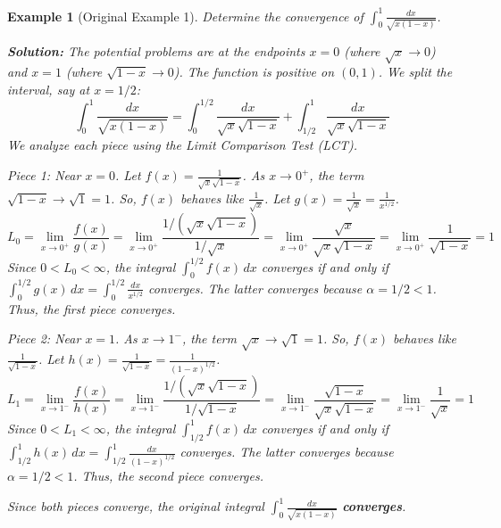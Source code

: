 \documentclass[11pt]{article}
\theoremstyle{mytheoremstyle}
\theoremstyle{mydefinitionstyle}
\newtheorem{example}[theorem]{Example}
\begin{document}
\begin{example}[Original Example 1]
Determine the convergence of $\int_0^1 \frac{dx}{\sqrt{x(1-x)}}$.

\textbf{Solution:}
The potential problems are at the endpoints $x=0$ (where $\sqrt{x} \to 0$) and $x=1$ (where $\sqrt{1-x} \to 0$). The function is positive on $(0, 1)$. We split the interval, say at $x=1/2$:
\[ \int_0^1 \frac{dx}{\sqrt{x(1-x)}} = \int_0^{1/2} \frac{dx}{\sqrt{x}\sqrt{1-x}} + \int_{1/2}^1 \frac{dx}{\sqrt{x}\sqrt{1-x}} \]
We analyze each piece using the Limit Comparison Test (LCT).

\emph{Piece 1: Near $x=0$.}
Let $f(x) = \frac{1}{\sqrt{x}\sqrt{1-x}}$. As $x \to 0^+$, the term $\sqrt{1-x} \to \sqrt{1} = 1$. So, $f(x)$ behaves like $\frac{1}{\sqrt{x}}$. Let $g(x) = \frac{1}{\sqrt{x}} = \frac{1}{x^{1/2}}$.
\[ L_0 = \lim_{x \to 0^+} \frac{f(x)}{g(x)} = \lim_{x \to 0^+} \frac{1/\left(\sqrt{x}\sqrt{1-x}\right)}{1/\sqrt{x}} = \lim_{x \to 0^+} \frac{\sqrt{x}}{\sqrt{x}\sqrt{1-x}} = \lim_{x \to 0^+} \frac{1}{\sqrt{1-x}} = 1 \]
Since $0 < L_0 < \infty$, the integral $\int_0^{1/2} f(x) \, dx$ converges if and only if $\int_0^{1/2} g(x) \, dx = \int_0^{1/2} \frac{dx}{x^{1/2}}$ converges. The latter converges because $\alpha = 1/2 < 1$. Thus, the first piece converges.

\emph{Piece 2: Near $x=1$.}
As $x \to 1^-$, the term $\sqrt{x} \to \sqrt{1} = 1$. So, $f(x)$ behaves like $\frac{1}{\sqrt{1-x}}$. Let $h(x) = \frac{1}{\sqrt{1-x}} = \frac{1}{(1-x)^{1/2}}$.
\[ L_1 = \lim_{x \to 1^-} \frac{f(x)}{h(x)} = \lim_{x \to 1^-} \frac{1/\left(\sqrt{x}\sqrt{1-x}\right)}{1/\sqrt{1-x}} = \lim_{x \to 1^-} \frac{\sqrt{1-x}}{\sqrt{x}\sqrt{1-x}} = \lim_{x \to 1^-} \frac{1}{\sqrt{x}} = 1 \]
Since $0 < L_1 < \infty$, the integral $\int_{1/2}^1 f(x) \, dx$ converges if and only if $\int_{1/2}^1 h(x) \, dx = \int_{1/2}^1 \frac{dx}{(1-x)^{1/2}}$ converges. The latter converges because $\alpha = 1/2 < 1$. Thus, the second piece converges.

Since both pieces converge, the original integral $\int_0^1 \frac{dx}{\sqrt{x(1-x)}}$ \textbf{converges}.
\end{example}
\end{document}
